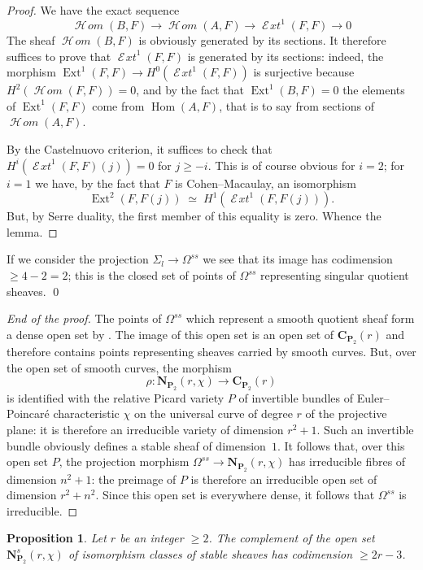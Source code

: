 \documentclass[12pt,english]{smfart}%
\theoremstyle{plain}
\newtheorem{proposition}[theorem]{Proposition}
\theoremstyle{definition}
\theoremstyle{remark}
\newcommand{\PP}{\mathbf{P}}
\DeclareMathOperator{\Hom}{Hom}
\DeclareMathOperator{\Ext}{Ext}
\newcommand{\Homsh}{\mathop{\mathcal{H}\!\mathit{om}}\nolimits}
\newcommand{\Extsh}{\mathop{\mathcal{E}\!\mathit{xt}}\nolimits}
\newcommand{\origpage}[1]{\marginnote{\scriptsize\itshape p.~#1}}
\begin{document}
\begin{proof}
We have the exact sequence
\[
\Homsh(B,F) \longrightarrow \Homsh(A,F) \longrightarrow \Extsh^{1}(F,F)
\longrightarrow 0
\]
The sheaf $\Homsh(B,F)$ is obviously generated by its sections. It therefore suffices to prove that $\Extsh^{1}(F,F)$ is generated by its sections: indeed, the morphism $\Ext^{1}(F,F)\to H^{0}(\Extsh^{1}(F,F))$ is surjective because $H^{2}(\Homsh(F,F))=0$,
\origpage{645}%
and by the fact that $\Ext^{1}(B,F)=0$ the elements of $\Ext^{1}(F,F)$ come from $\Hom(A,F)$, that is to say from sections of $\Homsh(A,F)$.

By the Castelnuovo criterion, it suffices to check that $H^{i}(\Extsh^{1}(F,F)(j))=0$ for $j\geq -i$. This is of course obvious for $i=2$; for $i=1$ we have, by the fact that $F$ is Cohen--Macaulay, an isomorphism
\[
\Ext^{2}(F,F(j)) \;\simeq\; H^{1}(\Extsh^{1}(F,F(j))).
\]
But, by Serre duality, the first member of this equality is zero. Whence the lemma.
\end{proof}

If we consider the projection $\Sigma_{l}\to\Omega^{ss}$ we see that its image has codimension $\geq 4-2=2$; this is the closed set of points of $\Omega^{ss}$ representing singular quotient sheaves. \qed

\begin{proof}[End of the proof]
The points of $\Omega^{ss}$ which represent a smooth quotient sheaf form a dense open set by . The image of this open set is an open set of $\mathbf{C}_{\PP_{2}}(r)$ and therefore contains points representing sheaves carried by smooth curves. But, over the open set of smooth curves, the morphism
\[
\rho : \mathbf{N}_{\PP_{2}}(r,\chi) \longrightarrow \mathbf{C}_{\PP_{2}}(r)
\]
is identified with the relative Picard variety $P$ of invertible bundles of Euler--Poincar\'e characteristic $\chi$ on the universal curve of degree $r$ of the projective plane: it is therefore an irreducible variety of dimension $r^{2}+1$. Such an invertible bundle obviously defines a stable sheaf of dimension~$1$. It follows that, over this open set $P$, the projection morphism $\Omega^{ss}\to\mathbf{N}_{\PP_{2}}(r,\chi)$ has irreducible fibres of dimension $n^{2}+1$: the preimage of $P$ is therefore an irreducible open set of dimension $r^{2}+n^{2}$. Since this open set is everywhere dense, it follows that $\Omega^{ss}$ is irreducible.
\end{proof}

\begin{proposition}\label{prop:stable-codim}
Let $r$ be an integer $\geq 2$. The complement of the open set $\mathbf{N}^{s}_{\PP_{2}}(r,\chi)$ of isomorphism classes of stable sheaves has codimension $\geq 2r-3$.
\end{proposition}
\end{document}

